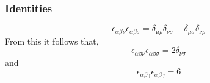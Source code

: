 \subsubsection{Identities}
\begin{equation}
\epsilon_{\alpha \beta \nu}\epsilon_{\alpha \beta \sigma} = \delta_{\mu \rho} \delta_{\nu \sigma} - \delta_{\mu \sigma}\delta_{\nu \rho}
\end{equation}
From this it follows that,
\begin{equation}
\epsilon_{\alpha \beta \nu}\epsilon_{\alpha \beta \sigma} = 2\delta_{\nu \sigma}
\end{equation}
and
\begin{equation}
\epsilon_{\alpha \beta \gamma}\epsilon_{\alpha \beta \gamma} = 6
\end{equation}